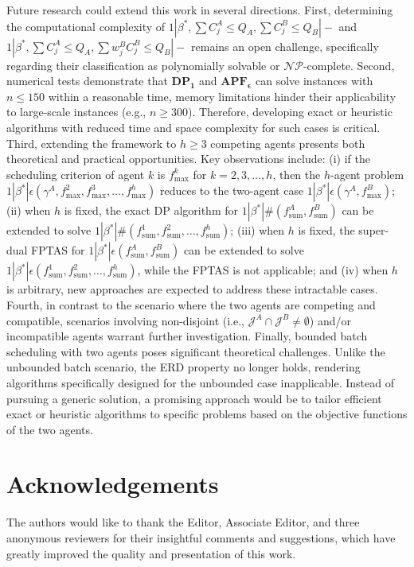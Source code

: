 \documentclass[12pt]{article}
\begin{document}
\begin{sloppypar}
Future research could extend this work in several directions. First, determining the computational complexity of $1 | \beta^{*}, \sum C_j^A \leq Q_A, \sum C_j^B \leq Q_B|-$ and $1 | \beta^{*}, \sum C_j^A \leq Q_A, \sum w_j^BC_j^B \leq Q_B|-$ remains an open challenge, specifically regarding their classification as polynomially solvable or $\mathcal{NP}$-complete. Second, numerical tests demonstrate that $\mathbf{DP_1}$ and $\mathbf{APF_{\epsilon}}$ can solve instances with $n \leq 150$ within a reasonable time, memory limitations hinder their applicability to large-scale instances (e.g., $n \geq 300$). Therefore, developing exact or heuristic algorithms with reduced time and space complexity for such cases is critical. Third, extending the framework to $h \geq 3$ competing agents presents both theoretical and practical opportunities. Key observations include: (i) if the scheduling criterion of agent $k$ is $f_{\max}^k$ for $k=2, 3, \ldots, h$, then the $h$-agent problem $1 | \beta^{*} |\epsilon(\gamma^A, f_{\max}^{2}, f_{\max}^{3}, \ldots, f_{\max}^{h})$ reduces to the two-agent case $1 | \beta^{*} |\epsilon(\gamma^A, f_{\max}^B)$; (ii) when $h$ is fixed, the exact DP algorithm for $1 | \beta^{*}|\#(f_{\mathrm{sum}}^A, f_{\mathrm{sum}}^B)$ can be extended to solve $1 | \beta^{*}|\#(f_{\mathrm{sum}}^1, f_{\mathrm{sum}}^2, \ldots, f_{\mathrm{sum}}^h)$; (iii) when $h$ is fixed, the super-dual FPTAS for $1 | \beta^{*}|\epsilon(f_{\mathrm{sum}}^A, f_{\mathrm{sum}}^B)$ can be extended to solve $1 | \beta^{*}|\epsilon(f_{\mathrm{sum}}^1, f_{\mathrm{sum}}^2, \ldots, f_{\mathrm{sum}}^h)$, while the FPTAS is not applicable; and (iv) when $h$ is arbitrary, new approaches are expected to address these intractable cases. Fourth, in contrast to the scenario where the two agents are competing and compatible, scenarios involving non-disjoint (i.e., ${\mathcal J}^{A} \cap {\mathcal J}^{B} \neq \emptyset$) and/or incompatible agents warrant further investigation. Finally, bounded batch scheduling with two agents poses significant theoretical challenges. Unlike the unbounded batch scenario, the ERD property no longer holds, rendering algorithms specifically designed for the unbounded case inapplicable. Instead of pursuing a generic solution, a promising approach would be to tailor efficient exact or heuristic algorithms to specific problems based on the objective functions of the two agents.

\section*{Acknowledgements}
The authors would like to thank the Editor, Associate Editor, and three anonymous reviewers for their insightful comments and suggestions, which have greatly improved the quality and presentation of this work.  


\end{sloppypar}
\end{document}

